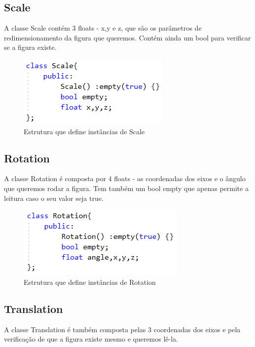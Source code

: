 \documentclass[a4paper]{article}
\begin{document}
\subsection{Scale}
\label{sec:scale}

A classe Scale contém 3 floats - x,y e z, que são os parâmetros de redimensionamento da figura que queremos. Contém ainda um bool para verificar se a figura existe.

\begin{figure}[H]
\centering
\includegraphics[scale=0.8]{scale.png}
\caption{Estrutura que define instâncias de Scale}
\label{img:Scale}
\end{figure}


\subsection{Rotation}
\label{sec:rotation}

A classe Rotation é composta por 4 floats - as coordenadas dos eixos e o ângulo que queremos rodar a figura. Tem também um bool empty que apenas permite a leitura caso o seu valor seja true.

\begin{figure}[H]
\centering
\includegraphics[scale=0.8]{rotation.png}
\caption{Estrutura que define instâncias de Rotation}
\label{img:Rotation}
\end{figure}


\subsection{Translation}
\label{sec:translation}

A classe Translation é também composta pelas 3 coordenadas dos eixos e pela verificação de que a figura existe mesmo e queremos lê-la.
\end{document}
